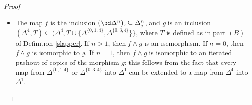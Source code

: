 \begin{proof}
\begin{itemize}
By construction, the inclusion $Z_0 \subseteq Z_q$
is a scaled anodyne map. The inclusion $\phi: Z_{q} \subseteq X' \times Y'$ is an
isomorphism of the underlying simplicial sets. If $n \neq 1$ or $m \neq 2$, then
$\phi$ is even an isomorphism of scaled simplicial sets, and the proof is complete.
The special case where $n = 1$ and $m = 2$ requires a bit more care: in this case,
we observe that $\phi$ can be obtained as a as a pushout of three scaled anodyne maps 
appearing in Remark \ref{slapperB}.

\item[$(1B)$] The map $f$ is the inclusion $( \bd \Delta^n)_{\flat} \subseteq \Delta^n_{\flat}$, and
$g$ is an inclusion
$(\Delta^4, T ) \subseteq (\Delta^4, T
\cup \{ \Delta^{ \{0,1,4 \} }, \Delta^{ \{0,3,4\} } \} \}$,
where $T$ is defined as in part $(B)$ of Definition \ref{slapper}. 
If $n > 1$, then $f \wedge g$ is an isomorphism. If $n=0$, then $f \wedge g$ is isomorphic to
$g$. If $n =1$, then $f \wedge g$ is isomorphic to an iterated pushout of copies of the morphism $g$; this follows from the fact that every map from $\Delta^{ \{0,1,4\} }$ or $\Delta^{ \{0,3,4\} }$ into
$\Delta^1$ can be extended to a map from $\Delta^4$ into $\Delta^1$.


\end{itemize}
\end{proof}
